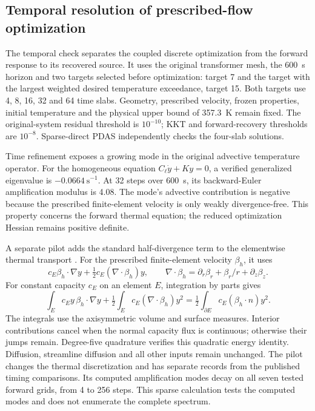 \subsection{Temporal resolution of prescribed-flow optimization}
\label{si:thermal_resolution}
The temporal check separates the coupled discrete optimization from
the forward response to its recovered source. It uses the original
transformer mesh, the 600~s horizon and two targets selected before
optimization: target 7 and the target with the largest weighted desired
temperature exceedance, target 15. Both targets use 4, 8, 16, 32 and
64 time slabs. Geometry, prescribed velocity, frozen properties, initial
temperature and the physical upper bound of 357.3~K remain fixed.
The original-system residual threshold is $10^{-10}$; KKT and
forward-recovery thresholds are $10^{-8}$.
Sparse-direct PDAS independently checks the four-slab solutions.

Time refinement exposes a growing mode in the original advective
temperature operator. For the homogeneous equation
$C_\ell\dot y+Ky=0$, a verified generalized eigenvalue is
$-0.0664~\mathrm{s}^{-1}$. At 32 steps over 600~s, its backward-Euler
amplification modulus is 4.08. The mode's advective contribution is
negative because the prescribed finite-element velocity is only weakly
divergence-free. This property concerns the forward thermal equation;
the reduced optimization Hessian remains positive definite.

A separate pilot adds the standard half-divergence term to the
elementwise thermal transport \citep{churbanov2012convection}.
For the prescribed finite-element velocity $\beta_h$, it uses
\begin{equation}\label{eq:thermal_skew_pilot}
 c_E\beta_h\cdot\nabla y
 +\tfrac12 c_E(\nabla\cdot\beta_h)y,
 \qquad
 \nabla\cdot\beta_h=\partial_r\beta_r+\beta_r/r+\partial_z\beta_z.
\end{equation}
For constant capacity $c_E$ on an element $E$, integration by parts gives
\begin{equation}\label{eq:thermal_skew_energy}
 \int_E c_Ey\,\beta_h\cdot\nabla y
 +\tfrac12\int_E c_E(\nabla\cdot\beta_h)y^2
 =\tfrac12\int_{\partial E}c_E(\beta_h\cdot n)y^2.
\end{equation}
The integrals use the axisymmetric volume and surface measures.
Interior contributions cancel when the normal capacity flux is continuous;
otherwise their jumps remain. Degree-five quadrature verifies this
quadratic energy identity. Diffusion, streamline diffusion and all other
inputs remain unchanged. The pilot changes the thermal discretization
and has separate records from the published timing comparisons.
Its computed amplification modes decay on all seven tested forward
grids, from 4 to 256 steps. This sparse calculation tests the computed
modes and does not enumerate the complete spectrum.

